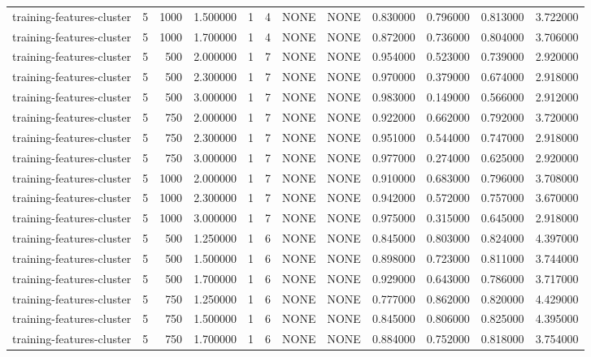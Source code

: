 \begin{tabular}{lrrrllllrrrr}
training-features-cluster & 5 & 1000 & 1.500000 & 1 & 4 & NONE & NONE & 0.830000 & 0.796000 & 0.813000 & 3.722000 \\
training-features-cluster & 5 & 1000 & 1.700000 & 1 & 4 & NONE & NONE & 0.872000 & 0.736000 & 0.804000 & 3.706000 \\
training-features-cluster & 5 & 500 & 2.000000 & 1 & 7 & NONE & NONE & 0.954000 & 0.523000 & 0.739000 & 2.920000 \\
training-features-cluster & 5 & 500 & 2.300000 & 1 & 7 & NONE & NONE & 0.970000 & 0.379000 & 0.674000 & 2.918000 \\
training-features-cluster & 5 & 500 & 3.000000 & 1 & 7 & NONE & NONE & 0.983000 & 0.149000 & 0.566000 & 2.912000 \\
training-features-cluster & 5 & 750 & 2.000000 & 1 & 7 & NONE & NONE & 0.922000 & 0.662000 & 0.792000 & 3.720000 \\
training-features-cluster & 5 & 750 & 2.300000 & 1 & 7 & NONE & NONE & 0.951000 & 0.544000 & 0.747000 & 2.918000 \\
training-features-cluster & 5 & 750 & 3.000000 & 1 & 7 & NONE & NONE & 0.977000 & 0.274000 & 0.625000 & 2.920000 \\
training-features-cluster & 5 & 1000 & 2.000000 & 1 & 7 & NONE & NONE & 0.910000 & 0.683000 & 0.796000 & 3.708000 \\
training-features-cluster & 5 & 1000 & 2.300000 & 1 & 7 & NONE & NONE & 0.942000 & 0.572000 & 0.757000 & 3.670000 \\
training-features-cluster & 5 & 1000 & 3.000000 & 1 & 7 & NONE & NONE & 0.975000 & 0.315000 & 0.645000 & 2.918000 \\
training-features-cluster & 5 & 500 & 1.250000 & 1 & 6 & NONE & NONE & 0.845000 & 0.803000 & 0.824000 & 4.397000 \\
training-features-cluster & 5 & 500 & 1.500000 & 1 & 6 & NONE & NONE & 0.898000 & 0.723000 & 0.811000 & 3.744000 \\
training-features-cluster & 5 & 500 & 1.700000 & 1 & 6 & NONE & NONE & 0.929000 & 0.643000 & 0.786000 & 3.717000 \\
training-features-cluster & 5 & 750 & 1.250000 & 1 & 6 & NONE & NONE & 0.777000 & 0.862000 & 0.820000 & 4.429000 \\
training-features-cluster & 5 & 750 & 1.500000 & 1 & 6 & NONE & NONE & 0.845000 & 0.806000 & 0.825000 & 4.395000 \\
training-features-cluster & 5 & 750 & 1.700000 & 1 & 6 & NONE & NONE & 0.884000 & 0.752000 & 0.818000 & 3.754000 \\

\end{tabular}
